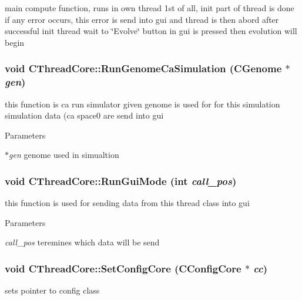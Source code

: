 \label{classCThreadCore_af78150953eef0f33cf28125f137d7fbb}
main compute function, runs in own thread 1st of all, init part of thread is done if any error occurs, this error is send into gui and thread is then abord after successful init thread wait to \char`\"{}Evolve\char`\"{} button in gui is pressed then evolution will begin \hypertarget{classCThreadCore_a73af8250e870e24d41f99f7e576fb466}{
\subsubsection[{RunGenomeCaSimulation}]{\setlength{\rightskip}{0pt plus 5cm}void CThreadCore::RunGenomeCaSimulation ({\bf CGenome} $\ast$ {\em gen})}}
\label{classCThreadCore_a73af8250e870e24d41f99f7e576fb466}
this function is ca run simulator given genome is used for for this simulation simulation data (ca space0 are send into gui


\begin{DoxyParams}{Parameters}
\item[{\em $\ast$gen}]genome used in simualtion \end{DoxyParams}
\hypertarget{classCThreadCore_a597d1ee93090b677f89f3ac6005e8561}{
\subsubsection[{RunGuiMode}]{\setlength{\rightskip}{0pt plus 5cm}void CThreadCore::RunGuiMode (int {\em call\_\-pos})}}
\label{classCThreadCore_a597d1ee93090b677f89f3ac6005e8561}
this function is used for sending data from this thread class into gui


\begin{DoxyParams}{Parameters}
\item[{\em call\_\-pos}]teremines which data will be send \end{DoxyParams}
\hypertarget{classCThreadCore_adfbf9fecc93acfb6f000f4d936a0f136}{
\subsubsection[{SetConfigCore}]{\setlength{\rightskip}{0pt plus 5cm}void CThreadCore::SetConfigCore ({\bf CConfigCore} $\ast$ {\em cc})}}
\label{classCThreadCore_adfbf9fecc93acfb6f000f4d936a0f136}
sets pointer to config class


